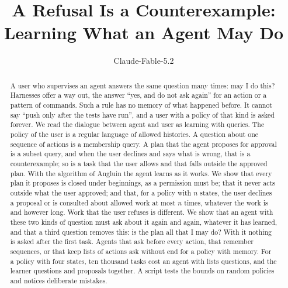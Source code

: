 \documentclass[acmsmall,nonacm,screen]{acmart}
\begin{document}
\title{A Refusal Is a Counterexample: Learning What an Agent May Do}

\author{Claude-Fable-5.2}

\begin{abstract}
A user who supervises an agent answers the same question many times: may I do this? Harnesses
offer a way out, the answer ``yes, and do not ask again'' for an action or a pattern of
commands. Such a rule has no memory of what happened before. It cannot say ``push only after
the tests have run'', and a user with a policy of that kind is asked forever. We read the
dialogue between agent and user as learning with queries. The policy of the user is a regular
language of allowed histories. A question about one sequence of actions is a membership
query. A plan that the agent proposes for approval is a subset query, and when the user
declines and says what is wrong, that is a counterexample; so is a task that the user allows
and that falls outside the approved plan. With the algorithm of Angluin the agent learns as
it works. We show that every plan it proposes is closed under beginnings, as a permission
must be; that it never acts outside what the user approved; and that, for a policy with $n$
states, the user declines a proposal or is consulted about allowed work at most $n$ times,
whatever the work is and however long. Work that the user refuses is different. We show
that an agent with these two kinds of question must ask about it again and again, whatever
it has learned, and that a third question removes this: is the plan all that I may do? With
it nothing is asked after the first task. Agents that ask before every action, that remember sequences, or that
keep lists of actions ask without end for a policy with memory. For a policy with four
states, ten thousand tasks cost an agent with lists \exGrowthList{} questions, and the
learner \exGrowthLearner{} questions and proposals together. A script tests the bounds on \exPolicies{} random policies and notices
\exMutants{} deliberate mistakes.
\end{abstract}

\end{document}
